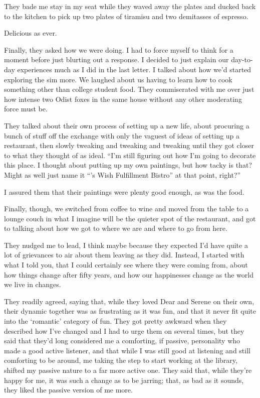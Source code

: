 They bade me stay in my seat while they waved away the plates and ducked back to the kitchen to pick up two plates of tiramisu and two demitasses of espresso.

Delicious as ever.

Finally, they asked how we were doing. I had to force myself to think for a moment before just blurting out a response. I decided to just explain our day-to-day experiences much as I did in the last letter. I talked about how we'd started exploring the sim more. We laughed about us having to learn how to cook something other than college student food. They commiserated with me over just how intense two Odist foxes in the same house without any other moderating force must be.

They talked about their own process of setting up a new life, about procuring a bunch of stuff off the exchange with only the vaguest of ideas of setting up a restaurant, then slowly tweaking and tweaking and tweaking until they got closer to what they thought of as ideal. ``I'm still figuring out how I'm going to decorate this place. I thought about putting up my own paintings, but how tacky is that? Might as well just name it ``\Partner 's Wish Fulfillment Bistro'' at that point, right?''

I assured them that their paintings were plenty good enough, as was the food.

Finally, though, we switched from coffee to wine and moved from the table to a lounge couch in what I imagine will be the quieter spot of the restaurant, and got to talking about how we got to where we are and where to go from here.

They nudged me to lead, I think maybe because they expected I'd have quite a lot of grievances to air about them leaving as they did. Instead, I started with what I told you, that I could certainly see where they were coming from, about how things change after fifty years, and how our happinesses change as the world we live in changes.

They readily agreed, saying that, while they loved Dear and Serene on their own, their dynamic together was as frustrating as it was fun, and that it never fit quite into the `romantic' category of fun. They got pretty awkward when they described how I've changed and I had to urge them on several times, but they said that they'd long considered me a comforting, if passive, personality who made a good active listener, and that while I was still good at listening and still comforting to be around, me taking the step to start working at the library, shifted my passive nature to a far more active one. They said that, while they're happy for me, it was such a change as to be jarring; that, as bad as it sounds, they liked the passive version of me more.


